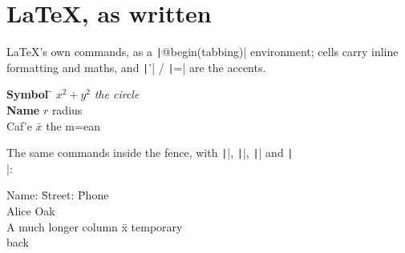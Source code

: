 \section{LaTeX, as written}

LaTeX's own commands, as a \texttt|@begin(tabbing)| environment; cells carry inline
formatting and maths, and \texttt|\a'| / \texttt|\a=| are the accents.

\begin{tabbing}
\textbf{Symbol}  \= $x^2 + y^2$  \= \emph{the circle} \\
\textbf{Name} \> $r$ \> radius \\
Caf\a'{e} \> $\bar{x}$ \> the m\a={e}an
\end{tabbing}

The same commands inside the fence, with \texttt|\pushtabs|, \texttt|\poptabs|, \texttt|\kill| and
\texttt|\\[len]|:

\begin{tabbing}
Name:  \= Street:  \= Phone \\
Alice  Oak  \\
\pushtabs
A much longer column  \= x \kill
\> temporary \\
\poptabs
\> back
\end{tabbing}

